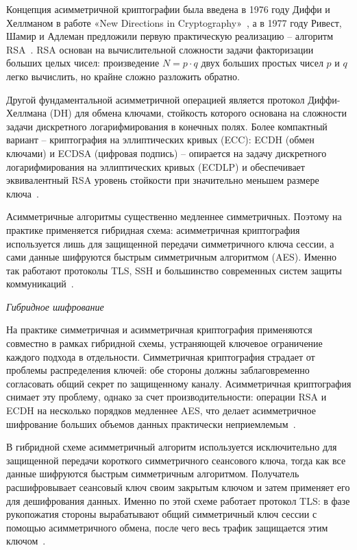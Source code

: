 \documentclass{itmo-vkr}
\begin{document}
	Концепция асимметричной криптографии была введена в 1976 году Диффи и Хеллманом в работе «New Directions in Cryptography»~\cite{diffie1976new}, а в 1977 году Ривест, Шамир и Адлеман предложили первую практическую реализацию -- алгоритм RSA~\cite{rivest1978method}. RSA основан на вычислительной сложности задачи факторизации больших целых чисел: произведение $N = p \cdot q$ двух больших простых чисел $p$ и $q$ легко вычислить, но крайне сложно разложить обратно.
	
	Другой фундаментальной асимметричной операцией является протокол Диффи-Хеллмана (DH) для обмена ключами, стойкость которого основана на сложности задачи дискретного логарифмирования в конечных полях. Более компактный вариант -- криптография на эллиптических кривых (ECC): ECDH (обмен ключами) и ECDSA (цифровая подпись) -- опирается на задачу дискретного логарифмирования на эллиптических кривых (ECDLP) и обеспечивает эквивалентный RSA уровень стойкости при значительно меньшем размере ключа~\cite{menezes1996handbook}.
	
	Асимметричные алгоритмы существенно медленнее симметричных. Поэтому на практике применяется гибридная схема: асимметричная криптография используется лишь для защищенной передачи симметричного ключа сессии, а сами данные шифруются быстрым симметричным алгоритмом (AES). Именно так работают протоколы TLS, SSH и большинство современных систем защиты коммуникаций~\cite{stallings2022cryptography}.
	
	\textit{Гибридное шифрование}

	На практике симметричная и асимметричная криптография применяются совместно в рамках гибридной схемы, устраняющей ключевое ограничение каждого подхода в отдельности. Симметричная криптография страдает от проблемы распределения ключей: обе стороны должны заблаговременно согласовать общий секрет по защищенному каналу. Асимметричная криптография снимает эту проблему, однако за счет производительности: операции RSA и ECDH на несколько порядков медленнее AES, что делает асимметричное шифрование больших объемов данных практически неприемлемым~\cite{stallings2022cryptography}.

	В гибридной схеме асимметричный алгоритм используется исключительно для защищенной передачи короткого симметричного сеансового ключа, тогда как все данные шифруются быстрым симметричным алгоритмом. Получатель расшифровывает сеансовый ключ своим закрытым ключом и затем применяет его для дешифрования данных. Именно по этой схеме работает протокол TLS: в фазе рукопожатия стороны вырабатывают общий симметричный ключ сессии с помощью асимметричного обмена, после чего весь трафик защищается этим ключом~\cite{stallings2022cryptography}.
	
\end{document}
